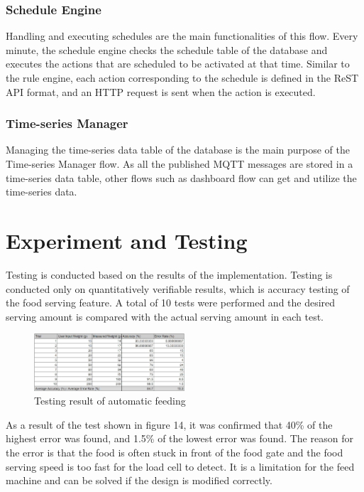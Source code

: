 ﻿\documentclass[conference]{IEEEtran}
\begin{document}
\subsubsection{Schedule Engine}
Handling and executing schedules are the main functionalities of this flow.
Every minute, the schedule engine checks the schedule table of the database and executes the actions that are scheduled to be activated at that time.
Similar to the rule engine, each action corresponding to the schedule is defined in the ReST API format, and an HTTP request is sent when the action is executed.

\subsubsection{Time-series Manager}
Managing the time-series data table of the database is the main purpose of the Time-series Manager flow.
As all the published MQTT messages are stored in a time-series data table, other flows such as dashboard flow can get and utilize the time-series data.

\section{Experiment and Testing}
Testing is conducted based on the results of the implementation.
Testing is conducted only on quantitatively verifiable results, which is accuracy testing of the food serving feature.
A total of 10 tests were performed and the desired serving amount is compared with the actual serving amount in each test.

\begin{figure}[htbp]
\centerline{\includegraphics[width=0.5\textwidth]{./images/Feeding_sheet.jpg}}
\caption{Testing result of automatic feeding}
\label{fig}
\end{figure}

As a result of the test shown in figure 14, it was confirmed that 40\% of the highest error was found, and 1.5\% of the lowest error was found.
The reason for the error is that the food is often stuck in front of the food gate and the food serving speed is too fast for the load cell to detect.
It is a limitation for the feed machine and can be solved if the design is modified correctly.
\end{document}
